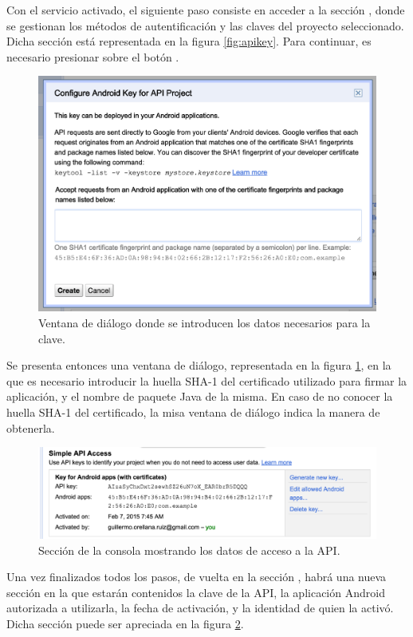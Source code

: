 Con el servicio activado, el siguiente paso consiste en acceder a la sección , donde se gestionan los métodos de autentificación y las claves del proyecto seleccionado. Dicha sección está representada en la figura \ref{fig:apikey}. Para continuar, es necesario presionar sobre el botón .

 \begin{figure}[H] \centering
    \includegraphics[width=15cm]{graphs/apikeydialog.png} \caption{Ventana de diálogo donde se introducen los datos necesarios para la clave.}\label{fig:apikeydialog}
\end{figure}

Se presenta entonces una ventana de diálogo, representada en la figura \ref{fig:apikeydialog}, en la que es necesario introducir la huella SHA-1 del certificado utilizado para firmar la aplicación, y el nombre de paquete Java de la misma. En caso de no conocer la huella SHA-1 del certificado, la misa ventana de diálogo indica la manera de obtenerla. 

 \begin{figure}[H] \centering
    \includegraphics[width=15cm]{graphs/apikeydone.png} \caption{Sección de la consola mostrando los datos de acceso a la API.}\label{fig:apikeydone}
\end{figure}

Una vez finalizados todos los pasos, de vuelta en la sección , habrá una nueva sección en la que estarán contenidos la clave de la API, la aplicación Android autorizada a utilizarla, la fecha de activación, y la identidad de quien la activó. Dicha sección puede ser apreciada en la figura \ref{fig:apikeydone}.

\chapterend